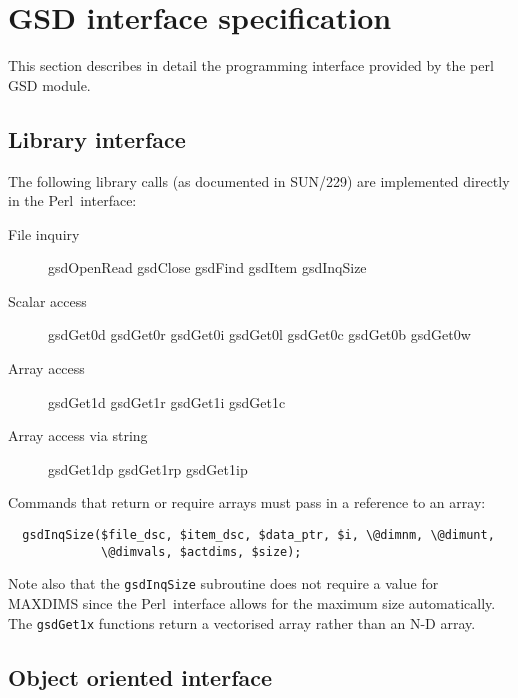 \documentclass[twoside,11pt]{article}
\newcommand{\perl}{\xref{\textsf{Perl}}{sun193}{}}
\newcommand{\xref}[3]{#1}
\renewcommand{\_}{\texttt{\symbol{95}}}
\begin{document}
\section{GSD interface specification\label{appgsd}}

This section describes in detail the programming interface provided 
by the perl GSD module.

\subsection{Library interface\label{LIBRARY_INTERFACE}}

The following library calls (as documented in SUN/229) are implemented
directly in the \perl\ interface:

\begin{description}
\item[File inquiry] \mbox{}

gsdOpenRead gsdClose gsdFind gsdItem gsdInqSize

\item[Scalar access] \mbox{}

gsdGet0d gsdGet0r gsdGet0i gsdGet0l gsdGet0c gsdGet0b gsdGet0w

\item[Array access] \mbox{}

gsdGet1d gsdGet1r gsdGet1i gsdGet1c

\item[Array access via string] \mbox{}

gsdGet1dp gsdGet1rp gsdGet1ip

\end{description}


Commands that return or require arrays must pass in a reference
to an array:

\begin{verbatim}
  gsdInqSize($file_dsc, $item_dsc, $data_ptr, $i, \@dimnm, \@dimunt,
             \@dimvals, $actdims, $size);
\end{verbatim}


Note also that the \texttt{gsdInqSize} subroutine does not require
a value for MAXDIMS since the \perl\ interface allows for the maximum
size automatically. The \texttt{gsdGet1x} functions return a vectorised
array rather than an N-D array.

\subsection{Object oriented interface\label{OBJECT_ORIENTED_INTERFACE}}
\end{document}
